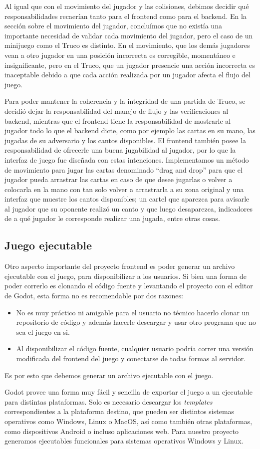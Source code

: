 Al igual que con el movimiento del jugador y las colisiones, debimos decidir qué 
responsabilidades recaerían tanto para el frontend como para el backend. En la sección 
sobre el movimiento del jugador, concluímos que no existía una importante necesidad de 
validar cada movimiento del jugador, pero el caso de un minijuego como el Truco es distinto. 
En el movimiento, que los demás jugadores vean a otro jugador en una posición incorrecta es 
corregible, momentáneo e insignificante, pero en el Truco, que un jugador presencie una acción 
incorrecta es inaceptable debido a que cada acción realizada por un jugador afecta el flujo del juego.

Para poder mantener la coherencia y la integridad de una partida de Truco, se decidió dejar 
la responsabilidad del manejo de flujo y las verificaciones al backend, mientras que el 
frontend tiene la responsabilidad de mostrarle al jugador todo lo que el backend dicte, 
como por ejemplo las cartas en su mano, las jugadas de su adversario y los cantos disponibles. 
El frontend también posee la responsabilidad de ofrecerle una buena jugabilidad al jugador, 
por lo que la interfaz de juego fue diseñada con estas intenciones. Implementamos un método 
de movimiento para jugar las cartas denominado “drag and drop” para que el jugador pueda 
arrastrar las cartas en caso de que desee jugarlas o volver a colocarla en la mano con tan 
solo volver a arrastrarla a su zona original y una interfaz que muestre los cantos disponibles; 
un cartel que aparezca para avisarle al jugador que su oponente realizó un canto y que luego 
desaparezca, indicadores de a qué jugador le corresponde realizar una jugada, entre otras cosas.

\subsection{Juego ejecutable}
\noindent Otro aspecto importante del proyecto frontend es poder generar un archivo ejecutable con el juego,
para disponibilizar a los usuarios.
Si bien una forma de poder correrlo es clonando el código fuente y levantando el proyecto con el editor
de Godot, esta forma no es recomendable por dos razones:
\begin{itemize}
    \item No es muy práctico ni amigable para el usuario no técnico hacerlo clonar un repositorio de código y además
    hacerle descargar y usar otro programa que no sea el juego en si.
    \item Al disponibilizar el código fuente, cualquier usuario podría correr una versión modificada del 
    frontend del juego y conectarse de todas formas al servidor.
\end{itemize}
Es por esto que debemos generar un archivo ejecutable con el juego.

Godot provee una forma muy fácil y sencilla de exportar el juego a un ejecutable para distintas plataformas.
Solo es necesario descargar los \textit{templates} correspondientes a la plataforma destino, que pueden ser
distintos sistemas operativos como Windows, Linux o MacOS, así como también otras plataformas, como dispositivos
Android o incluso aplicaciones web.
Para nuestro proyecto generamos ejecutables funcionales para sistemas operativos Windows y Linux.